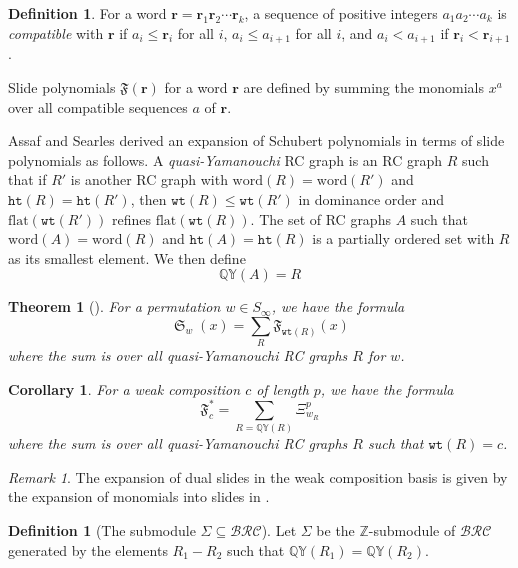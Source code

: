 \documentclass{amsart}
\newtheorem{corollary}[lemma]{Corollary}
\newtheorem{theorem}{Theorem}[section]
\theoremstyle{definition}
\newtheorem{definition}[lemma]{Definition}
\theoremstyle{remark}
\newtheorem*{remark}{Remark}
\numberwithin{equation}{subsection}
\DeclareMathOperator{\sch}{\mathfrak{S}}
\newcommand{\wof}[1]{w_{#1}}
\newcommand{\wtt}{\mathtt{wt}}
\newcommand{\QY}{\ensuremath{\mathbb{QY}}}
\newcommand{\hr}{\mathtt{ht}}
\newcommand{\BRC}{\mathcal{BRC}}
\newcommand{\dsch}{\ensuremath{\Xi}}
\begin{document}
\begin{definition}
For a word $\mathbf{r}=\mathbf{r}_1\mathbf{r}_2\cdots \mathbf{r}_k$, a sequence of positive integers $a_1a_2\cdots a_k$ is \emph{compatible} with $\mathbf{r}$ if $a_i\leq \mathbf{r}_i$ for all $i$, $a_i\leq a_{i+1}$ for all $i$, and $a_i<a_{i+1}$ if $\mathbf{r}_i<\mathbf{r}_{i+1}$.

Slide polynomials $\mathfrak{F}(\mathbf{r})$ for a word $\mathbf{r}$ are defined by summing the monomials $x^a$ over all compatible sequences $a$ of $\mathbf{r}$.

Assaf and Searles \cite{assaf2017slide} derived an expansion of Schubert polynomials in terms of slide polynomials as follows. A \emph{quasi-Yamanouchi} RC graph is an RC graph $R$ such that if $R'$ is another RC graph with $\mathrm{word}(R)=\mathrm{word}(R')$ and $\hr(R)=\hr(R')$, then $\wtt(R)\leq \wtt(R')$ in dominance order and $\mathrm{flat}(\wtt(R'))$ refines $\mathrm{flat}(\wtt(R))$. The set of RC graphs $A$ such that $\mathrm{word}(A)=\mathrm{word}(R)$ and $\hr(A)=\hr(R)$ is a partially ordered set with $R$ as its smallest element. We then define
$$\QY(A)=R$$
\end{definition}

\begin{theorem}[{\cite[Theorem~3.13]{assaf2017slide}}]
  For a permutation $w\in S_\infty$, we have the formula
  $$\sch_w(x) = \sum_{R} \mathfrak{F}_{\wtt(R)}(x)$$
  where the sum is over all quasi-Yamanouchi RC graphs $R$ for $w$.
\end{theorem}
\begin{corollary}
  For a weak composition $c$ of length $p$, we have the formula
  $$\mathfrak{F}_c^* = \sum_{R=\QY(R)} \dsch_{\wof{R}}^p$$
  where the sum is over all quasi-Yamanouchi RC graphs $R$ such that $\wtt(R) = c$.
\end{corollary}


\begin{remark}
The expansion of dual slides in the weak composition basis is given by the expansion of monomials into slides in \cite[Theorem~5.2]{nadeau2024ppartitions}.
\end{remark}

\begin{definition}[The submodule $\Sigma\subseteq \BRC$]
Let $\Sigma$ be the $\mathbb{Z}$-submodule of $\BRC$ generated by the elements $R_1-R_2$ such that $\QY(R_1)=\QY(R_2)$.
\end{definition}
\end{document}
